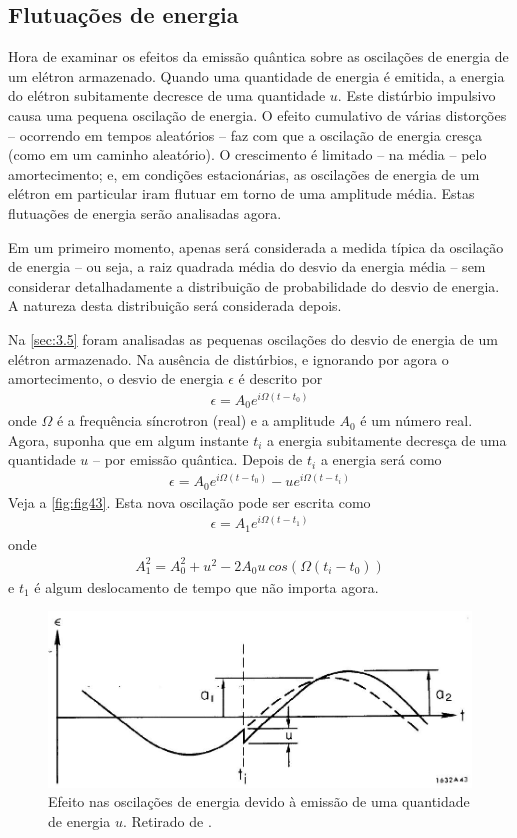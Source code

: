 \subsection{Flutuações de energia}
Hora de examinar os efeitos da emissão quântica sobre as oscilações de energia de um elétron armazenado. Quando uma quantidade de energia é emitida, a energia do elétron subitamente decresce de uma quantidade $u$. Este distúrbio impulsivo causa uma pequena oscilação de energia. O efeito cumulativo de várias distorções -- ocorrendo em tempos aleatórios -- faz com que a oscilação de energia cresça (como em um caminho aleatório). O crescimento é limitado -- na média -- pelo amortecimento; e, em condições estacionárias, as oscilações de energia de um elétron em particular iram flutuar em torno de uma amplitude média. Estas flutuações de energia serão analisadas agora.

Em um primeiro momento, apenas será considerada a medida típica da oscilação de energia -- ou seja, a raiz quadrada média do desvio da energia média -- sem considerar detalhadamente a distribuição de probabilidade do desvio de energia. A natureza desta distribuição será considerada depois.

Na \autoref{sec:3.5} foram analisadas as pequenas oscilações do desvio de energia de um elétron armazenado. Na ausência de distúrbios, e ignorando por agora o amortecimento, o desvio de energia $\epsilon$ é descrito por
\begin{align}
	\epsilon = A_0 e^{i\Omega(t-t_0)}
\end{align}
onde $\Omega$ é a frequência síncrotron (real) e a amplitude $A_0$ é um número real. Agora, suponha que em algum instante $t_i$ a energia subitamente decresça de uma quantidade $u$ -- por emissão quântica. Depois de $t_i$ a energia será como
\begin{align}
	\epsilon = A_0 e^{i\Omega(t-t_0)} - ue^{i\Omega(t-t_i)}
\end{align}
Veja a \autoref{fig:fig43}. Esta nova oscilação pode ser escrita como
\begin{align}
	\epsilon = A_1e^{i\Omega(t-t_1)}
\end{align}
onde
\begin{align}
	A_1^2 = A_0^2 + u^2 - 2A_0u\ cos(\Omega (t_i-t_0))
\end{align}
e $t_1$ é algum deslocamento de tempo que não importa agora.

\begin{figure}[!htb]
	\centering
	\includegraphics[width=0.9\linewidth]{./Figuras/fig43.jpeg}
	\caption{Efeito nas oscilações de energia devido à emissão de uma quantidade de energia $u$. Retirado de \cite{sands1970physics}.}
	\label{fig:fig43}
\end{figure}

